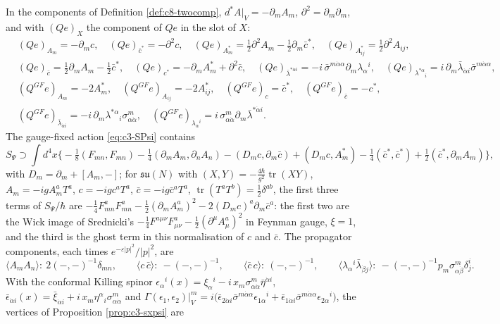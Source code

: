 \begin{remark}
\label{rem:c3-twocomp}
In the components of Definition \ref{def:c8-twocomp}, $d^*A|_V=-\partial_mA_m$, $\partial^2=\partial_m\partial_m$, and with $(Qe)_X$ the component of $Qe$ in the slot of $X$:
\[
\begin{aligned}
&(Qe)_{A_m}=-\partial_mc,\quad (Qe)_{\bar c^*}=-\partial^2c,\quad (Qe)_{A^*_m}=\tfrac12\partial^2A_m-\tfrac12\partial_m\bar c^*,\quad (Qe)_{A^*_{ij}}=\tfrac12\partial^2A_{ij},\\
&(Qe)_{\bar c}=\tfrac12\partial_mA_m-\tfrac12\bar c^*,\quad (Qe)_{c^*}=-\partial_mA^*_m+\partial^2\bar c,\quad (Qe)_{\bar\lambda^{*\dot\alpha i}}=-i\,\bar\sigma^{m\dot\alpha\alpha}\partial_m\lambda_\alpha{}^i,\quad (Qe)_{\lambda^{*\alpha}{}_i}=i\,\partial_m\bar\lambda_{\dot\alpha i}\bar\sigma^{m\dot\alpha\alpha},\\
&(Q^{GF}e)_{A_m}=-2A^*_m,\quad (Q^{GF}e)_{A_{ij}}=-2A^*_{ij},\quad (Q^{GF}e)_c=\bar c^*,\quad (Q^{GF}e)_{\bar c}=-c^*,\\
&(Q^{GF}e)_{\bar\lambda_{\dot\alpha i}}=-i\,\partial_m\lambda^{*\alpha}{}_i\sigma^m_{\alpha\dot\alpha},\quad (Q^{GF}e)_{\lambda_\alpha{}^i}=i\,\sigma^m_{\alpha\dot\alpha}\partial_m\bar\lambda^{*\dot\alpha i}.
\end{aligned}
\]
The gauge-fixed action \eqref{eq:c3-SPsi} contains
\[
S_\Psi\supset\int d^4x\Big\{-\tfrac18(F_{mn},F_{mn})-\tfrac14(\partial_mA_m,\partial_nA_n)-(D_mc,\partial_m\bar c)+(D_mc,A^*_m)-\tfrac14(\bar c^*,\bar c^*)+\tfrac12(\bar c^*,\partial_mA_m)\Big\},
\]
with $D_m=\partial_m+[A_m,-]$; for $\mathfrak{su}(N)$ with $(X,Y)=-\tfrac{4\hbar}{g^2}\operatorname{tr}(XY)$, $A_m=-igA^a_mT^a$, $c=-igc^aT^a$, $\bar c=-ig\bar c^aT^a$, $\operatorname{tr}(T^aT^b)=\tfrac12\delta^{ab}$, the first three terms of $S_\Psi/\hbar$ are $-\tfrac14F^a_{mn}F^a_{mn}-\tfrac12(\partial_mA^a_m)^2-2(D_mc)^a\partial_m\bar c^a$: the first two are the Wick image of Srednicki's $-\tfrac14F^{a\mu\nu}F^a_{\mu\nu}-\tfrac12(\partial^\mu A^a_\mu)^2$ in Feynman gauge, $\xi=1$, and the third is the ghost term in this normalisation of $c$ and $\bar c$. The propagator components, each times $e^{-\varepsilon|p|^2}/|p|^2$, are
\[
\langle A_mA_n\rangle:\ 2(-,-)^{-1}\delta_{mn},\qquad \langle c\,\bar c\rangle:\ -(-,-)^{-1},\qquad \langle\bar c\,c\rangle:\ (-,-)^{-1},\qquad \langle\lambda_\alpha{}^i\bar\lambda_{\dot\beta j}\rangle:\ -(-,-)^{-1}p_m\sigma^m_{\alpha\dot\beta}\delta^i_j .
\]
With the conformal Killing spinor $\epsilon_\alpha{}^i(x)=\xi_\alpha{}^i-i\,x_m\sigma^m_{\alpha\dot\alpha}\bar\eta^{\dot\alpha i}$, $\bar\epsilon_{\dot\alpha i}(x)=\bar\xi_{\dot\alpha i}+i\,x_m\eta^\alpha{}_i\sigma^m_{\alpha\dot\alpha}$ and $\Gamma(\epsilon_1,\epsilon_2)|_V^m=i\big(\bar\epsilon_{2\dot\alpha i}\bar\sigma^{m\dot\alpha\alpha}\epsilon_{1\alpha}{}^i+\bar\epsilon_{1\dot\alpha i}\bar\sigma^{m\dot\alpha\alpha}\epsilon_{2\alpha}{}^i\big)$, the vertices of Proposition \ref{prop:c3-sxpsi} are

\end{remark}

